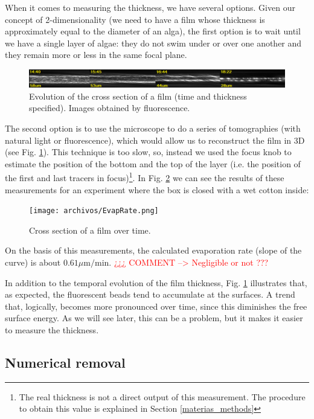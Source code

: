 When it comes to measuring the thickness, we have several options. Given our concept of 2-dimensionality (we need to have a film whose thickness is approximately equal to the diameter of an alga), the first option is to wait until we have a single layer of algae: they do not swim under or over one another and they remain more or less in the same focal plane.

\begin{figure}[H]
	\centering
	\includegraphics[width=\textwidth]{archivos/ThicknessEvolution.png}
	\caption{Evolution of the cross section of a film (time and thickness specified). Images obtained by fluorescence.}
	\label{thickness}
\end{figure}

The second option is to use the microscope to do a series of tomographies (with natural light or fluorescence), which would allow us to reconstruct the film in 3D (see Fig. \ref{thickness}). This technique is too slow, so, instead we used the focus knob to estimate the position of the bottom and the top of the layer (i.e. the position of the first and last tracers in focus)\footnote{The real thickness is not a direct output of this measurement. The procedure to obtain this value is explained in Section \ref{materias_methods}}. In Fig. \ref{evap_rate} we can see the results of these measurements for an experiment where the box is closed with a wet cotton inside:

\begin{figure}[H]
	\centering
	\texttt{[image: archivos/EvapRate.png]}
	\caption{Cross section of a film over time.}
	\label{evap_rate}
\end{figure}

On the basis of this measurements, the calculated evaporation rate (slope of the curve) is about $ 0.61 \mu \textrm{m/min}$. \textcolor{red}{¿¿¿ COMMENT --> Negligible or not ???}

In addition to the temporal evolution of the film thickness, Fig. \ref{thickness} illustrates that, as expected, the fluorescent beads tend to accumulate at the surfaces. A trend that, logically, becomes more pronounced over time, since this diminishes the free surface energy. As we will see later, this can be a problem, but it makes it easier to measure the thickness.

\subsection{Numerical removal}

